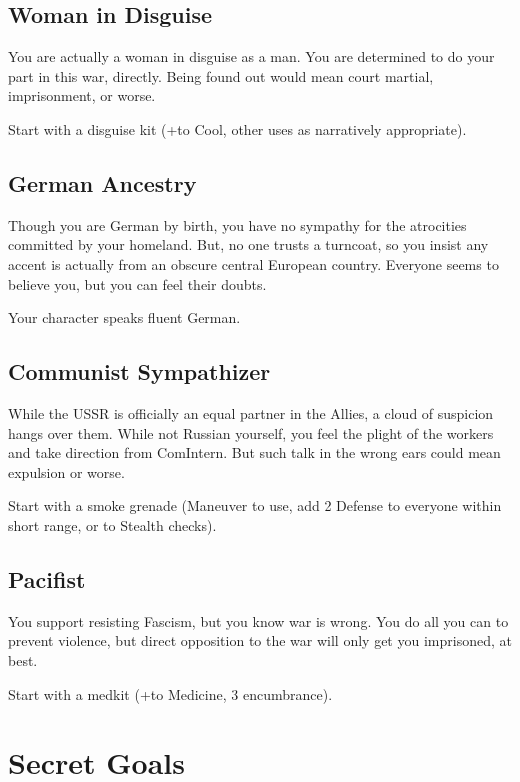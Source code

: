 \documentclass[background]{book}
\newcommand{\bbb}{\BoostDie}
\begin{document}
\begin{multicols}{2}
\subsection{Woman in Disguise}

You are actually a woman in disguise as a man.  You are determined to do your part in this war, directly.  Being found out would mean court martial, imprisonment, or worse.

Start with a disguise kit (+\bbb to Cool, other uses as narratively appropriate).

\subsection{German Ancestry}

Though you are German by birth, you have no sympathy for the atrocities committed by your homeland.  But, no one trusts a turncoat, so you insist any accent is actually from an obscure central European country.  Everyone seems to believe you, but you can feel their doubts.

Your character speaks fluent German.

\subsection{Communist Sympathizer}

While the USSR is officially an equal partner in the Allies, a cloud of suspicion hangs over them.  While not Russian yourself, you feel the plight of the workers and take direction from ComIntern.  But such talk in the wrong ears could mean expulsion or worse.

Start with a smoke grenade (Maneuver to use, add 2 Defense to everyone within short range, or \bbb\bbb to Stealth checks).

\subsection{Pacifist}

You support resisting Fascism, but you know war is wrong.  You do all you can to prevent violence, but direct opposition to the war will only get you imprisoned, at best.

Start with a medkit (+\bbb to Medicine, 3 encumbrance).

\section{Secret Goals}


\end{multicols}
\end{document}
